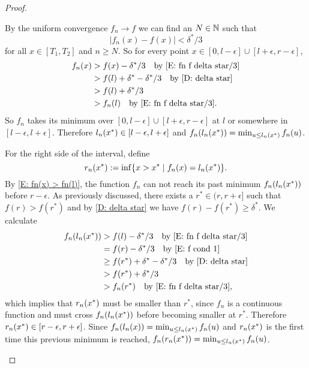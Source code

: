 \begin{proof}
\begin{proofpart}
By the uniform convergence $f_n \rightarrow f$ we can find an $N \in \mathbb{N}$
such that 
\begin{equation} \label{E: fn f delta star/3}
|f_n(x) - f(x)| < \delta^* / 3
\end{equation} for all
$x \in [T_1, T_2]$ and $n \geq N$.
So for every point $x \in [0, l - \epsilon]\cup[l + \epsilon, r - \epsilon]$,
\begin{equation} \label{E: fn(x) > fn(l)}
\begin{aligned}
f_n(x) &> 
f(x) - \delta^* / 3 \quad \text{by \eqref{E: fn f delta star/3}}\\
&> f(l) + \delta^* - \delta^* / 3 \quad \text{by \eqref{D: delta star}}\\
&> f(l) + \delta^* / 3 \\
&> f_n(l) \quad \text{by \eqref{E: fn f delta star/3}}.
\end{aligned}
\end{equation}
So $f_n$ takes its minimum over 
$[0, l - \epsilon]\cup[l + \epsilon, r - \epsilon]$
at $l$ or somewhere in $[l-\epsilon, l+\epsilon]$.
Therefore $l_n(x^*) \in [l-\epsilon, l+\epsilon]$ and $f_n(l_n(x^*)) = \min_{u \leq l_n(x^*)} f_n(u)$.

\bigskip

For the right side of the interval, define
\begin{equation} \label{D: rnx}
r_n(x^*) := \inf \{ x > x^* \; | \; f_n(x) = l_n(x^*) \}.
\end{equation}
By \eqref{E: fn(x) > fn(l)}, the function $f_n$ can not reach its past minimum $f_n(l_n(x^*))$
before $r-\epsilon$.
As previously discussed,
there exists a $r^* \in (r, r+\epsilon]$ such that $f(r) > f(r^*)$ 
and by \eqref{D: delta star} we have $f(r) - f(r^*) \geq \delta^*$.
We calculate
\begin{equation}
\begin{aligned}
f_n(l_n(x^*)) 
&> f(l) - \delta^* / 3 \quad \text{by \eqref{E: fn f delta star/3}}\\
&= f(r) - \delta^* / 3 \quad \text{by \eqref{E: f cond 1}}\\
&\geq f(r^*) + \delta^* - \delta^* / 3 \quad \text{by \eqref{D: delta star}} \\
&> f(r^*) + \delta^*/3 \\
&> f_n(r^*) \quad \text{by \eqref{E: fn f delta star/3}},
\end{aligned}
\end{equation}
which implies that $r_n(x^*)$ must be smaller than $r^*$,
since $f_n$ is a continuous function and must cross $f_n(l_n(x^*))$ before becoming smaller at $r^*$.
Therefore $r_n(x^*) \in [r - \epsilon, r+ \epsilon]$.
Since $f_n(l_n(x)) = \min_{u \leq l_n(x^*)} f_n(u)$
and $r_n(x^*)$ is the first time this previous minimum is reached,
$f_n(r_n(x^*)) = \min_{u \leq l_n(x^*)} f_n(u)$.


\end{proofpart}
\end{proof}
